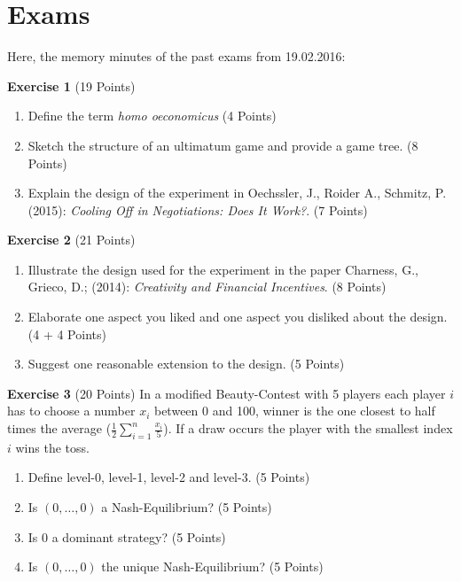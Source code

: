 \chapter*{Exams} 

Here, the memory minutes of the past exams from 19.02.2016:

\textbf{Exercise 1} (19 Points)
\begin{enumerate}[label=\alph*\upshape)]
	\item Define the term \textit{homo oeconomicus} (4 Points)
	\item Sketch the structure of an ultimatum game and provide a game tree. (8 Points)
	\item Explain the design of the experiment in Oechssler, J., Roider A., Schmitz, P. (2015): \textit{Cooling Off in Negotiations: Does It Work?}. (7 Points)
\end{enumerate}
\textbf{Exercise 2} (21 Points)
\begin{enumerate}[label=\alph*\upshape)]
	\item Illustrate the design used for the experiment in the paper Charness, G., Grieco, D.; (2014): \textit{Creativity and Financial Incentives}. (8 Points)
	\item Elaborate one aspect you liked and one aspect you disliked about the design. (4 + 4 Points)
	\item Suggest one reasonable extension to the design. (5 Points)
\end{enumerate}
\textbf{Exercise 3} (20 Points)
In a modified Beauty-Contest with 5 players each player $i$ has to choose a number $x_{i}$ between 0 and 100, winner is the one closest to half times the average ($\frac{1}{2} \sum_{i = 1}^{n} \frac{x_{i}}{5}$). If a draw occurs the player with the smallest index $i$ wins the toss.
\begin{enumerate}[label=\alph*\upshape)]
	\item Define level-0, level-1, level-2 and level-3. (5 Points)
	\item Is $(0, \dotsc, 0)$ a Nash-Equilibrium? (5 Points)
	\item Is $0$ a dominant strategy? (5 Points)
	\item Is $(0, \dotsc, 0)$ the unique Nash-Equilibrium? (5 Points)
\end{enumerate}